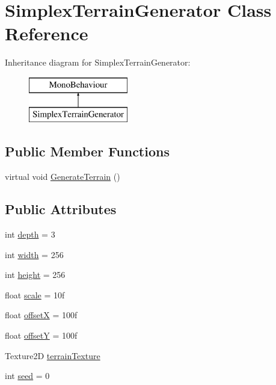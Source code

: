 \hypertarget{class_simplex_terrain_generator}{}\section{Simplex\+Terrain\+Generator Class Reference}
\label{class_simplex_terrain_generator}
Inheritance diagram for Simplex\+Terrain\+Generator\+:\begin{figure}[H]
\begin{center}
\leavevmode
\includegraphics[height=2.000000cm]{class_simplex_terrain_generator}
\end{center}
\end{figure}
\subsection*{Public Member Functions}
\begin{DoxyCompactItemize}
\item 
virtual void \mbox{\hyperlink{class_simplex_terrain_generator_a6d5c45df36f2cc746064d710e35fcd0d}{Generate\+Terrain}} ()
\end{DoxyCompactItemize}
\subsection*{Public Attributes}
\begin{DoxyCompactItemize}
\item 
int \mbox{\hyperlink{class_simplex_terrain_generator_a24f6db85e150e5a30d396aa1cec62e61}{depth}} = 3
\item 
int \mbox{\hyperlink{class_simplex_terrain_generator_acc680a118dccdeb8f2357b13c08563cf}{width}} = 256
\item 
int \mbox{\hyperlink{class_simplex_terrain_generator_a6676586ef4da8c227277362ef96edcc5}{height}} = 256
\item 
float \mbox{\hyperlink{class_simplex_terrain_generator_a5917969e0c0dc92d2775c43bc67ac719}{scale}} = 10f
\item 
float \mbox{\hyperlink{class_simplex_terrain_generator_ac88a461cc43702ec1bc43ac2ec4f4f02}{offsetX}} = 100f
\item 
float \mbox{\hyperlink{class_simplex_terrain_generator_a38e5635574c1ea006575e1425aae3bae}{offsetY}} = 100f
\item 
Texture2D \mbox{\hyperlink{class_simplex_terrain_generator_a4bbaab3f3e220ccd50f53e462ddea0ae}{terrain\+Texture}}
\item 
int \mbox{\hyperlink{class_simplex_terrain_generator_a3d43d13142cafdf8ca3122f2b1445bc1}{seed}} = 0
\end{DoxyCompactItemize}


